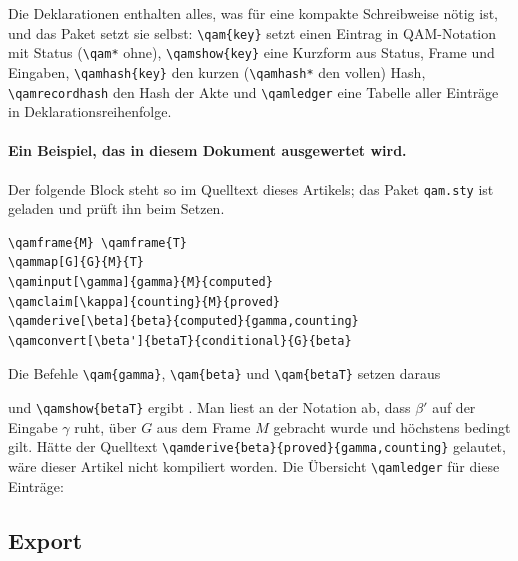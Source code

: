 Die Deklarationen enthalten alles, was für eine kompakte Schreibweise nötig ist, und das Paket setzt sie selbst: \verb|\qam{key}| setzt
einen Eintrag in QAM-Notation mit Status (\verb|\qam*| ohne), \verb|\qamshow{key}| eine Kurzform aus Status, Frame und Eingaben,
\verb|\qamhash{key}| den kurzen (\verb|\qamhash*| den vollen) Hash, \verb|\qamrecordhash| den Hash der Akte und \verb|\qamledger| eine
Tabelle aller Einträge in Deklarationsreihenfolge.

\paragraph{Ein Beispiel, das in diesem Dokument ausgewertet wird.} Der folgende Block steht so im Quelltext dieses Artikels; das Paket
\texttt{qam.sty} ist geladen und prüft ihn beim Setzen.
\begin{lstlisting}
\qamframe{M} \qamframe{T}
\qammap[G]{G}{M}{T}
\qaminput[\gamma]{gamma}{M}{computed}
\qamclaim[\kappa]{counting}{M}{proved}
\qamderive[\beta]{beta}{computed}{gamma,counting}
\qamconvert[\beta']{betaT}{conditional}{G}{beta}
\end{lstlisting}
Die Befehle \verb|\qam{gamma}|, \verb|\qam{beta}| und \verb|\qam{betaT}| setzen daraus
\begin{center}
\qquad {}\qquad {}
\end{center}
und \verb|\qamshow{betaT}| ergibt . Man liest an der Notation ab, dass \(\beta'\) auf der Eingabe \(\gamma\) ruht, über \(G\)
aus dem Frame \(M\) gebracht wurde und höchstens bedingt gilt. Hätte der Quelltext \verb|\qamderive{beta}{proved}{gamma,counting}|
gelautet, wäre dieser Artikel nicht kompiliert worden. Die Übersicht \verb|\qamledger| für diese Einträge:
\begin{center}
\small
\qamledger
\end{center}

\subsection{Export}

